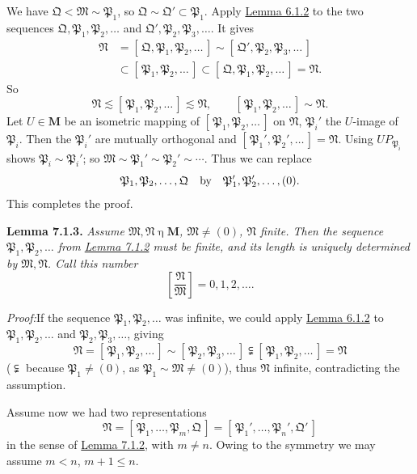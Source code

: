 \documentclass[12pt,b5paper,twoside]{article}
\newcommand{\M}{\mathbf M}
\newcommand{\clos}[1]{[\,#1\,]}
\newcommand{\Lemma}[1]{%
  \par\smallskip\noindent\phantomsection\label{lem:#1}\textbf{Lemma #1.}\enspace
}
\newcommand{\Proof}{\par\noindent\textit{Proof:}\enspace}
\newcommand{\lemref}[1]{\hyperref[lem:#1]{Lemma #1}}
\begin{document}
We have \(\mathfrak Q<\mathfrak M\sim\mathfrak P_1\), so
\(\mathfrak Q\sim\mathfrak Q'\subset\mathfrak P_1\). Apply
\lemref{6.1.2} to the two sequences
\(\mathfrak Q,\mathfrak P_1,\mathfrak P_2,\ldots\) and
\(\mathfrak Q',\mathfrak P_2,\mathfrak P_3,\ldots\). It gives
\begin{align*}
 \mathfrak N
 &=\clos{\mathfrak Q,\mathfrak P_1,\mathfrak P_2,\ldots}
 \sim\clos{\mathfrak Q',\mathfrak P_2,\mathfrak P_3,\ldots}\\
 &\subset\clos{\mathfrak P_1,\mathfrak P_2,\ldots}
 \subset\clos{\mathfrak Q,\mathfrak P_1,\mathfrak P_2,\ldots}
 =\mathfrak N.
\end{align*}
So
\[
 \mathfrak N\lesssim\clos{\mathfrak P_1,\mathfrak P_2,\ldots}
 \lesssim\mathfrak N,
 \qquad
 \clos{\mathfrak P_1,\mathfrak P_2,\ldots}\sim\mathfrak N.
\]
Let \(U\in\M\) be an isometric mapping of
\(\clos{\mathfrak P_1,\mathfrak P_2,\ldots}\) on \(\mathfrak N\),
\(\mathfrak P_i'\) the \(U\)-image of \(\mathfrak P_i\). Then the
\(\mathfrak P_i'\) are mutually orthogonal and
\(\clos{\mathfrak P_1',\mathfrak P_2',\ldots}=\mathfrak N\). Using
\(UP_{\mathfrak P_i}\) shows \(\mathfrak P_i\sim\mathfrak P_i'\); so
\(\mathfrak M\sim\mathfrak P_1'\sim\mathfrak P_2'\sim\cdots\). Thus we
can replace
\[
 \mathfrak P_1,\mathfrak P_2,\ldots,\mathfrak Q
 \quad\hbox{by}\quad
 \mathfrak P_1',\mathfrak P_2',\ldots,(0).
\]
This completes the proof.

\Lemma{7.1.3} {\itshape
Assume \(\mathfrak M,\mathfrak N\mathbin{\eta}\M\),
\(\mathfrak M\ne(0)\), \(\mathfrak N\) finite. Then the sequence
\(\mathfrak P_1,\mathfrak P_2,\ldots\) from \lemref{7.1.2} must be finite,
and its length is uniquely determined by \(\mathfrak M,\mathfrak N\). Call
this number
\[
 \left[\frac{\mathfrak N}{\mathfrak M}\right]=0,1,2,\ldots.
\]
}

\Proof If the sequence \(\mathfrak P_1,\mathfrak P_2,\ldots\) was infinite,
we could apply \lemref{6.1.2} to
\(\mathfrak P_1,\mathfrak P_2,\ldots\) and
\(\mathfrak P_2,\mathfrak P_3,\ldots\), giving
\[
 \mathfrak N=\clos{\mathfrak P_1,\mathfrak P_2,\ldots}
 \sim\clos{\mathfrak P_2,\mathfrak P_3,\ldots}
 \subsetneqq\clos{\mathfrak P_1,\mathfrak P_2,\ldots}=\mathfrak N
\]
(\(\subsetneqq\) because \(\mathfrak P_1\ne(0)\), as
\(\mathfrak P_1\sim\mathfrak M\ne(0)\)), thus \(\mathfrak N\) infinite,
contradicting the assumption.

Assume now we had two representations
\[
 \mathfrak N
 =\clos{\mathfrak P_1,\ldots,\mathfrak P_m,\mathfrak Q}
 =\clos{\mathfrak P_1',\ldots,\mathfrak P_n',\mathfrak Q'}
\]
in the sense of \lemref{7.1.2}, with \(m\ne n\). Owing to the symmetry we
may assume \(m<n\), \(m+1\leq n\).
\end{document}
